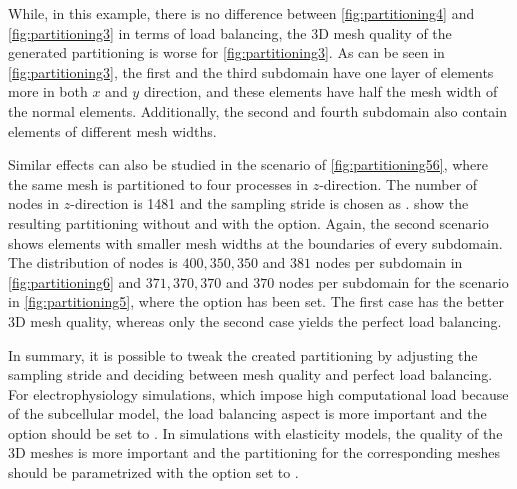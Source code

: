 While, in this example, there is no difference between \cref{fig:partitioning4}  and \cref{fig:partitioning3} in terms of load balancing, the 3D mesh quality of the generated partitioning is worse for \cref{fig:partitioning3}. As can be seen in \cref{fig:partitioning3}, the first and the third subdomain have one layer of elements more in both $x$ and $y$ direction, and these elements have half the mesh width of the normal elements. Additionally, the second and fourth subdomain also contain elements of different mesh widths.

Similar effects can also be studied in the scenario of \cref{fig:partitioning56}, where the same mesh is partitioned to four processes in $z$-direction. The number of nodes in $z$-direction is \num{1481} and the sampling stride is chosen as .  show the resulting partitioning without and with the  option. Again, the second scenario shows  elements with smaller mesh widths at the boundaries of every subdomain. The distribution of nodes is $400,350,350$ and $381$ nodes per subdomain in \cref{fig:partitioning6} and $371,370,370$ and $370$ nodes per subdomain for the scenario in \cref{fig:partitioning5}, where the  option has been set. The first case has the better 3D mesh quality, whereas only the second case yields the perfect load balancing.

In summary, it is possible to tweak the created partitioning by adjusting the sampling stride and deciding between mesh quality and perfect load balancing. For electrophysiology simulations, which impose high computational load because of the subcellular model, the load balancing aspect is more important and the option   should be set to . In simulations with elasticity models, the quality of the 3D meshes is more important and the partitioning for the corresponding meshes should be parametrized with the   option set to .

